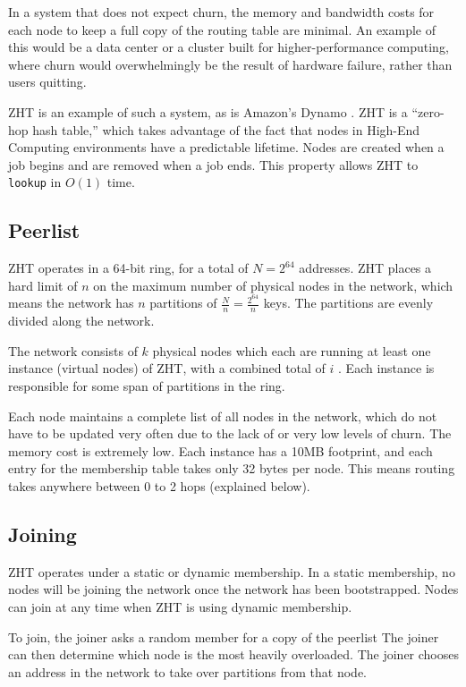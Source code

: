 In a system that does not expect churn, the memory and bandwidth costs for each node to keep a full copy of the routing table are minimal.
An example of this would be a data center or a cluster built for higher-performance computing, where churn would overwhelmingly be the result of hardware failure, rather than users quitting.

ZHT \cite{li2013zht} is an example of such a system, as is Amazon's Dynamo \cite{dynamo}.
ZHT is a ``zero-hop hash table,'' which takes advantage of the fact that  nodes in  High-End Computing environments have a predictable lifetime.
Nodes are created when a job begins and are removed when a job ends.
This property allows ZHT to \texttt{lookup} in $ O(1) $ time.

\subsection*{Peerlist}

ZHT operates in a 64-bit ring, for a total of $N = 2^{64}$ addresses.
ZHT places a  hard limit of $ n $ on the maximum number of physical nodes in the network, which means the network has $n$ partitions of $\frac{N}{n} =  \frac{2^{64}}{n}$ keys.
The partitions are evenly divided along the network.

The network consists of $k$ physical nodes which each are running at least one instance (virtual nodes) of ZHT, with a combined total of $i$ .
Each instance is responsible for some span of partitions in the ring.


Each node maintains a complete list of all nodes in the network, which do not have to be updated very often due to the lack of or very low levels of churn.
The memory cost is extremely low.
Each instance has a 10MB footprint, and each entry for the membership table takes only 32 bytes per node.
This means routing takes anywhere between 0 to 2 hops (explained below).

\subsection*{Joining}
ZHT operates under a static or dynamic membership.
In a static membership, no nodes will be joining the network once the network has been bootstrapped.
Nodes can join at any time when ZHT is using dynamic membership.

To join, the joiner asks a random member for a copy of the peerlist 
The joiner can then determine which node is the most heavily overloaded.
The joiner chooses an address in the network to take over partitions from that node.


